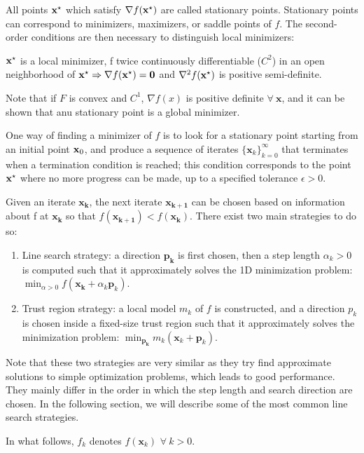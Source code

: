 All points $\mathbf{x}^{\star}$ which satisfy $\nabla f(\mathbf{x}^{\star})$ are called
stationary points. Stationary points can correspond to minimizers,
maximizers, or saddle points of $f$. The second-order conditions are
then necessary to distinguish local minimizers:

$\mathbf{x}^{\star}$ is a local minimizer, f twice continuously differentiable
($C^2$) in an open neighborhood of $\mathbf{x}^{\star} \Rightarrow \nabla
f(\mathbf{x}^{\star}) = \mathbf{0}$ and $\nabla^2 f(\mathbf{x}^{\star})$ is positive
semi-definite.

Note that if $F$ is convex and $C^1$, $\nabla f(x)$ is positive
definite $\forall~\mathbf{x}$, and it can be shown that anu stationary
point is a global minimizer.

One way of finding a minimizer of $f$ is to look for a stationary
point starting from an initial point $\mathbf{x}_0$, and produce a
sequence of iterates $\{\mathbf{x}_k\}_{k=0}^{\infty}$ that terminates
when a termination condition is reached; this condition corresponds to
the point $\mathbf{x}^{\star}$ where no more progress can be made, up to a
specified tolerance $\epsilon > 0$.

Given an iterate $\mathbf{x_k}$, the next iterate $\mathbf{x_{k+1}}$
can be chosen based on information about f at $\mathbf{x_k}$ so that
$f(\mathbf{x_{k+1}})<f(\mathbf{x_k})$. There exist two main strategies
to do so:

\begin{enumerate}
\item Line search strategy: a direction $\mathbf{p_k}$ is first
  chosen, then a step length $\alpha_k > 0$ is computed such that it
  approximately solves the 1D minimization problem: $\min_{\alpha>0}
  f(\mathbf{x_k}+\alpha_k\mathbf{p}_k)$.
\item Trust region strategy: a local model $m_k$ of $f$ is
  constructed, and a direction $p_k$ is chosen inside a fixed-size
  trust region such that it approximately solves the minimization
  problem: $\min_\mathbf{p_k} m_k(\mathbf{x}_k+\mathbf{p}_k)$.
\end{enumerate}

Note that these two strategies are very similar as they try find
approximate solutions to simple optimization problems, which leads to
good performance. They mainly differ in the order in which the step
length and search direction are chosen. In the following section, we
will describe some of the most common line search strategies.

In what follows, $f_k$ denotes $f(\mathbf{x}_k)$ $\forall~k > 0$.

